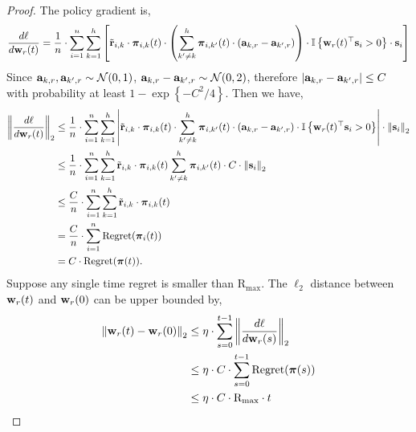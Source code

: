 \documentclass[10pt]{article}
\begin{document}
\begin{proof}
The policy gradient is,
\begin{equation*}
	\frac{d\ell}{d {\mathbf{w}}_r(t)} = \frac{1}{n} \cdot \sum\limits_{i=1}^{n}{ \sum\limits_{k=1}^{h}{ \left[ {\tilde{\mathbf{r}}}_{i,k} \cdot {\boldsymbol{\pi}}_{i,k}(t) \cdot \left( \sum\limits_{k^\prime \not= k}^{h}{ {\boldsymbol{\pi}}_{i,k^\prime}(t) \cdot \left( {\mathbf{a}}_{k,r} - {\mathbf{a}}_{k^\prime,r} \right)  } \right) \cdot {\mathbb{I}}\left\{ {\mathbf{w}}_r(t)^\top {\mathbf{s}}_i > 0 \right\} \cdot {\mathbf{s}}_i \right] } }
\end{equation*}
Since ${\mathbf{a}}_{k,r}, {\mathbf{a}}_{k^\prime,r} \sim {\mathcal{N}}(0, 1)$, ${\mathbf{a}}_{k,r} - {\mathbf{a}}_{k^\prime,r} \sim {\mathcal{N}}(0, 2)$, therefore $\left| {\mathbf{a}}_{k,r} - {\mathbf{a}}_{k^\prime,r} \right| \le C$ with  probability at least $1 - \exp\left\{ - C^2/4 \right\} $. Then we have,
\begin{equation*}
\begin{split}
	\left\| \frac{d\ell}{d {\mathbf{w}}_r(t)} \right\|_2 &\le \frac{1}{n} \cdot \sum\limits_{i=1}^{n}{ \sum\limits_{k=1}^{h}{ \left| {\tilde{\mathbf{r}}}_{i,k} \cdot {\boldsymbol{\pi}}_{i,k}(t) \cdot \sum\limits_{k^\prime \not= k}^{h}{ {\boldsymbol{\pi}}_{i,k^\prime}(t) \cdot \left( {\mathbf{a}}_{k,r} - {\mathbf{a}}_{k^\prime,r} \right)  } \cdot {\mathbb{I}}\left\{ {\mathbf{w}}_r(t)^\top {\mathbf{s}}_i > 0 \right\} \right| \cdot \left\| {\mathbf{s}}_i \right\|_2 }} \\
	&\le \frac{1}{n} \cdot \sum\limits_{i=1}^{n}{ \sum\limits_{k=1}^{h}{ {\tilde{\mathbf{r}}}_{i,k} \cdot {\boldsymbol{\pi}}_{i,k}(t) \sum\limits_{k^\prime \not= k}^{h}{ {\boldsymbol{\pi}}_{i,k^\prime}(t) \cdot C  } \cdot \left\| {\mathbf{s}}_i \right\|_2  }} \\
	&\le \frac{C}{n} \cdot \sum\limits_{i=1}^{n}{ \sum\limits_{k=1}^{h}{ {\tilde{\mathbf{r}}}_{i,k} \cdot {\boldsymbol{\pi}}_{i,k}(t) }} \\
	&= \frac{C}{n} \cdot \sum\limits_{i=1}^{n}{ {\text{Regret}}({\boldsymbol{\pi}}_{i}(t)) } \\
	&= C \cdot {\text{Regret}}({\boldsymbol{\pi}}(t)).
\end{split}
\end{equation*}
Suppose any single time regret is smaller than $\text{R}_{\max}$.
The $\ell_2$ distance between ${\mathbf{w}}_r(t)$ and ${\mathbf{w}}_r(0)$ can be upper bounded by,
\begin{equation*}
\begin{split}
	\left\| \rvw_r(t) - \rvw_r(0) \right\|_2 &\le \eta \cdot \sum\limits_{s=0}^{t-1}{\left\| \frac{d\ell}{d \rvw_r(s)} \right\|_2} \\
	&\le \eta \cdot C \cdot \sum\limits_{s=0}^{t-1}{ \regret(\rvpi(s)) } \\
	&\le \eta \cdot C \cdot \text{R}_{\max} \cdot t
\end{split}

\end{equation*}
\end{proof}
\end{document}
